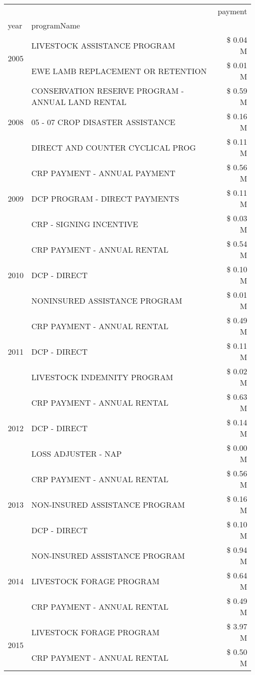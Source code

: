 \begin{tabular}{llr}
\toprule
 &  & payment \\
year & programName &  \\
\midrule
\multirow[t]{2}{*}{2005} & LIVESTOCK ASSISTANCE PROGRAM & \$ 0.04 M \\
 & EWE LAMB REPLACEMENT OR RETENTION & \$ 0.01 M \\
\cline{1-3}
\multirow[t]{3}{*}{2008} & CONSERVATION RESERVE PROGRAM - ANNUAL LAND RENTAL & \$ 0.59 M \\
 & 05 - 07 CROP DISASTER ASSISTANCE & \$ 0.16 M \\
 & DIRECT AND COUNTER CYCLICAL PROG & \$ 0.11 M \\
\cline{1-3}
\multirow[t]{3}{*}{2009} & CRP PAYMENT - ANNUAL PAYMENT & \$ 0.56 M \\
 & DCP PROGRAM - DIRECT PAYMENTS & \$ 0.11 M \\
 & CRP - SIGNING INCENTIVE & \$ 0.03 M \\
\cline{1-3}
\multirow[t]{3}{*}{2010} & CRP PAYMENT - ANNUAL RENTAL & \$ 0.54 M \\
 & DCP - DIRECT & \$ 0.10 M \\
 & NONINSURED ASSISTANCE PROGRAM & \$ 0.01 M \\
\cline{1-3}
\multirow[t]{3}{*}{2011} & CRP PAYMENT - ANNUAL RENTAL & \$ 0.49 M \\
 & DCP - DIRECT & \$ 0.11 M \\
 & LIVESTOCK INDEMNITY PROGRAM & \$ 0.02 M \\
\cline{1-3}
\multirow[t]{3}{*}{2012} & CRP PAYMENT - ANNUAL RENTAL & \$ 0.63 M \\
 & DCP - DIRECT & \$ 0.14 M \\
 & LOSS ADJUSTER - NAP & \$ 0.00 M \\
\cline{1-3}
\multirow[t]{3}{*}{2013} & CRP PAYMENT - ANNUAL RENTAL & \$ 0.56 M \\
 & NON-INSURED ASSISTANCE PROGRAM & \$ 0.16 M \\
 & DCP - DIRECT & \$ 0.10 M \\
\cline{1-3}
\multirow[t]{3}{*}{2014} & NON-INSURED ASSISTANCE PROGRAM & \$ 0.94 M \\
 & LIVESTOCK FORAGE PROGRAM & \$ 0.64 M \\
 & CRP PAYMENT - ANNUAL RENTAL & \$ 0.49 M \\
\cline{1-3}
\multirow[t]{3}{*}{2015} & LIVESTOCK FORAGE PROGRAM & \$ 3.97 M \\
 & CRP PAYMENT - ANNUAL RENTAL & \$ 0.50 M \\

\end{tabular}
